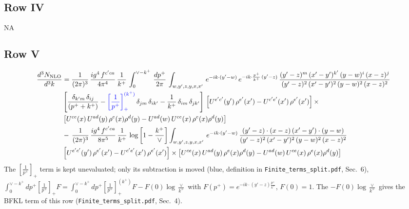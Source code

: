 \documentclass[9pt]{article}
\newcommand{\new}[1]{{\color{blue}#1}}
\numberwithin{equation}{section}
\begin{document}
\subsection{Row IV}
\textsc{NA}
\subsection{Row V}
\begin{align}
    \frac{d^{3}N_{\rm NLO}}{d^{3}k} & = \frac{1}{(2\pi)^{3}}\, \frac{ig^{4}\,f^{c'ca}}{4\pi^{4}}\, \frac{1}{k^{+}}\,\int_{0}^{\vee-k^{+}}\, \frac{dp^{+}}{2\pi}\, \int_{w,y',z,y,x,x'}\, e^{-ik\cdot (y'-w)}\, e^{-ik\cdot \frac{p^{+}}{k^{+}}\,(y'-z)}\,\frac{(y'-z)^{m}\,(x'-y')^{k'}\,(y-w)^{i}\,(x-z)^{j}}{(y'-z)^{2}\,(x'-y')^{2}\,(y-w)^{2}\,(x-z)^{2}}\notag \\ & \left[\frac{\delta_{k'm}\,\delta_{ij}}{(p^{+}+k^{+})}-\new{\left[\frac{1}{p^{+}}\right]_{+}^{(k^{+})}}\,\delta_{jm}\,\delta_{ik'}-\frac{1}{k^{+}}\, \delta_{im}\, \delta_{jk'}\right]\, \left[U^{e'c'}(y')\,\rho^{e'}(x')-U^{c'e'}(x')\,\rho^{e'}(x')\right]\times \notag \\ &  \left[U^{ce}(x)\,U^{ad}(y)\,\rho^{e}(x)\rho^{d}(y)-U^{ad}(w)\,U^{ce}(x)\,\rho^{e}(x)\rho^{d}(y)\right]\notag \\ & -\,\frac{1}{(2\pi)^{3}}\, \frac{ig^{4}\,f^{c'ca}}{8\pi^{5}}\, \frac{1}{k^{+}}\, \log{\left[1-\frac{k^{+}}{\vee}\right]} \int_{w,y',z,y,x,x'}\, e^{-ik\cdot (y'-w)}\,\frac{(y'-z)\cdot (x-z)\,(x'-y')\cdot (y-w)}{(y'-z)^{2}\,(x'-y')^{2}\,(y-w)^{2}\,(x-z)^{2}}\notag \\ & \left[U^{e'c'}(y')\,\rho^{e'}(x')-U^{c'e'}(x')\,\rho^{e'}(x')\right]\times  \left[U^{ce}(x)\,U^{ad}(y)\,\rho^{e}(x)\rho^{d}(y)-U^{ad}(w)\,U^{ce}(x)\,\rho^{e}(x)\rho^{d}(y)\right]
\end{align}
\new{The $\left[\frac{1}{p^+}\right]_+$ term is kept unevaluated; only its subtraction is moved (blue, definition in \texttt{Finite\_terms\_split.pdf}, Sec.~6), $\int_0^{\vee-k^+}dp^+\left[\frac{1}{p^+}\right]_+F=\int_0^{\vee-k^+}dp^+\left[\frac{1}{p^+}\right]_+^{(k^+)}F-F(0)\log\frac{\vee}{k^+}$ with $F(p^+)=e^{-ik\cdot(y'-z)\frac{p^+}{k^+}}$, $F(0)=1$. The $-F(0)\log\frac{\vee}{k^+}$ gives the BFKL term of this row (\texttt{Finite\_terms\_split.pdf}, Sec.~4).}
\end{document}
